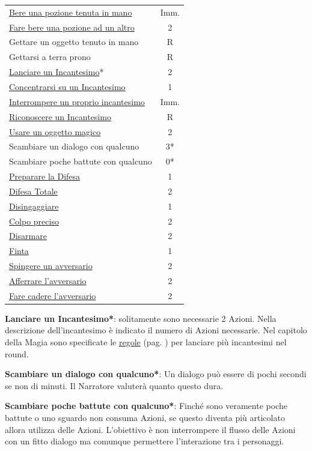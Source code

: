 \begin{multicols}{2}
\begin{tabular}{lc}
\midrule
\hyperlink{insorgenzaveleno}{Bere una pozione tenuta in mano}& Imm.\\
\hyperlink{insorgenzaveleno}{Fare bere una pozione ad un altro} & 2\\
\midrule
Gettare un oggetto tenuto in mano& R\\
Gettarsi a terra prono& R\\
\midrule
\hyperlink{magietempodilancio}{Lanciare un Incantesimo}*& 2\\
\hyperlink{magieconcentrazione}{Concentrarsi su un Incantesimo}& 1\\
\hyperlink{magiedurata}{Interrompere un proprio incantesimo} & Imm.\\
\hyperlink{riconoscereincantesimo}{Riconoscere un Incantesimo}& R\\
\hyperlink{regoleoggettimagici}{Usare un oggetto magico}& 2\\
\midrule
Scambiare un dialogo con qualcuno& 3*\\
Scambiare poche battute con qualcuno& 0*\\
\midrule
\hyperlink{preparareladifesa}{Preparare la Difesa} & 1\\
\hyperlink{difesatotale}{Difesa Totale} & 2\\
\hyperlink{disingaggiare}{Disingaggiare} & 1\\
\hyperlink{colpopreciso}{Colpo preciso} & 2\\
\midrule
\hyperlink{disarmare}{Disarmare} & 2\\
\hyperlink{finta}{Finta} & 1\\
\hyperlink{spingereavversario}{Spingere un avversario} & 2\\
\hyperlink{afferrareunavversario}{Afferrare l'avversario} & 2\\
\hyperlink{farecadereavversario}{Fare cadere l'avversario} & 2
\end{tabular}

\medskip

\textbf{Lanciare un Incantesimo*}: solitamente sono necessarie 2 Azioni. Nella descrizione dell'incantesimo è indicato il numero di Azioni necessarie. Nel capitolo della Magia sono specificate le \hyperlink{piumagieround}{regole} (pag. \pageref{piumagieround}) per lanciare più incantesimi nel round.

\textbf{Scambiare un dialogo con qualcuno*}: Un dialogo può essere di pochi secondi se non di minuti. Il Narratore valuterà quanto questo dura.

\textbf{Scambiare poche battute con qualcuno*}: Finché sono veramente poche battute o uno sguardo non consuma Azioni, se questo diventa più articolato allora utilizza delle Azioni. L'obiettivo è non interrompere il flusso delle Azioni con un fitto dialogo ma comunque permettere l'interazione tra i personaggi.


\end{multicols}
